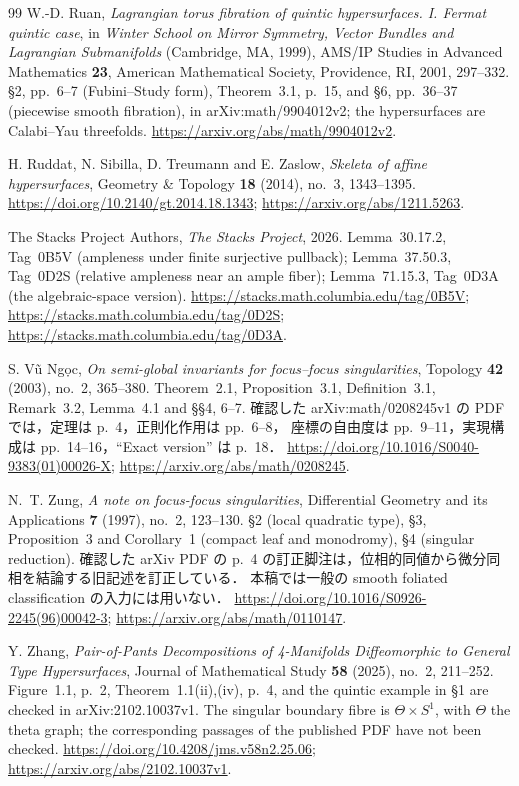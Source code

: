 \begin{thebibliography}{99}
W.-D. Ruan,
\emph{Lagrangian torus fibration of quintic hypersurfaces. I. Fermat quintic case},
in \emph{Winter School on Mirror Symmetry, Vector Bundles and Lagrangian Submanifolds}
(Cambridge, MA, 1999), AMS/IP Studies in Advanced Mathematics \textbf{23},
American Mathematical Society, Providence, RI, 2001, 297--332.
\S2, pp.~6--7 (Fubini--Study form), Theorem~3.1, p.~15,
and \S6, pp.~36--37 (piecewise smooth fibration),
in arXiv:math/9904012v2; the hypersurfaces are Calabi--Yau threefolds.
\url{https://arxiv.org/abs/math/9904012v2}.

H. Ruddat, N. Sibilla, D. Treumann and E. Zaslow,
\emph{Skeleta of affine hypersurfaces},
Geometry \& Topology \textbf{18} (2014), no.~3, 1343--1395.
\url{https://doi.org/10.2140/gt.2014.18.1343};
\url{https://arxiv.org/abs/1211.5263}.

The Stacks Project Authors,
\emph{The Stacks Project}, 2026.
Lemma~30.17.2, Tag~0B5V (ampleness under finite surjective pullback);
Lemma~37.50.3, Tag~0D2S (relative ampleness near an ample fiber);
Lemma~71.15.3, Tag~0D3A (the algebraic-space version).
\url{https://stacks.math.columbia.edu/tag/0B5V};
\url{https://stacks.math.columbia.edu/tag/0D2S};
\url{https://stacks.math.columbia.edu/tag/0D3A}.

S. Vũ Ngọc,
\emph{On semi-global invariants for focus--focus singularities},
Topology \textbf{42} (2003), no.~2, 365--380.
Theorem~2.1, Proposition~3.1, Definition~3.1, Remark~3.2,
Lemma~4.1 and \S\S4, 6--7.
確認した arXiv:math/0208245v1 の PDF では，定理は p.~4，正則化作用は pp.~6--8，
座標の自由度は pp.~9--11，実現構成は pp.~14--16，``Exact version'' は p.~18．
\url{https://doi.org/10.1016/S0040-9383(01)00026-X};
\url{https://arxiv.org/abs/math/0208245}.

N.~T. Zung,
\emph{A note on focus-focus singularities},
Differential Geometry and its Applications \textbf{7} (1997), no.~2, 123--130.
\S2 (local quadratic type), \S3, Proposition~3 and Corollary~1 (compact leaf and monodromy),
\S4 (singular reduction).
確認した arXiv PDF の p.~4 の訂正脚注は，位相的同値から微分同相を結論する旧記述を訂正している．
本稿では一般の smooth foliated classification の入力には用いない．
\url{https://doi.org/10.1016/S0926-2245(96)00042-3};
\url{https://arxiv.org/abs/math/0110147}.

Y. Zhang,
\emph{Pair-of-Pants Decompositions of 4-Manifolds Diffeomorphic to General Type Hypersurfaces},
Journal of Mathematical Study \textbf{58} (2025), no.~2, 211--252.
Figure~1.1, p.~2, Theorem~1.1(ii),(iv), p.~4,
and the quintic example in \S1 are checked in arXiv:2102.10037v1.
The singular boundary fibre is $\Theta\times S^1$, with $\Theta$ the theta graph;
the corresponding passages of the published PDF have not been checked.
\url{https://doi.org/10.4208/jms.v58n2.25.06};
\url{https://arxiv.org/abs/2102.10037v1}.


\end{thebibliography}
